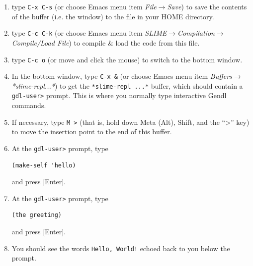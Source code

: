 \documentclass [11pt]{book}
\begin{document}
\begin{enumerate}
\begin{figure}
\begin{lrbox}{\boxedverb}
\begin{minipage}{\linewidth}
\begin{verbatim}
 (in-package :gdl-user)

 (define-object hello ()

   :computed-slots 
   ((greeting "Hello, World!")))

\end{verbatim}
\end{minipage}
\end{lrbox}
\fbox{\usebox{\boxedverb}}

\caption{Example of Simple Object Definition}

\label{fig:simpleobjectdefinition}

\end{figure}

\item type \texttt{C-x C-s} (or choose Emacs menu item \emph{File$\rightarrow$Save}) to save the contents of the buffer (i.e. the window) 
to the file in your HOME directory.

\item type \texttt{C-c C-k} (or choose Emacs menu item \emph{SLIME$\rightarrow$Compilation$\rightarrow$Compile/Load File}) to compile \& load the code from this file.

\item type \texttt{C-c o} (or move and click the mouse)  to switch to the bottom window.

\item In the bottom window, type \texttt{C-x \&} (or choose Emacs menu item \emph{Buffers$\rightarrow$*slime-repl...*}) to get the \texttt{*slime-repl ...*} buffer, which should contain a \texttt{gdl-user>} prompt. This is where you normally type interactive Gendl commands.

\item If necessary, type \texttt{M \textgreater} (that is, hold down Meta (Alt), Shift, and the ``\textgreater'' key) to
move the insertion point to the end of this buffer.

\item At the \texttt{gdl-user>} prompt, type 

\begin{verbatim}(make-self 'hello)
\end{verbatim} and press [Enter].

\item At the \texttt{gdl-user>} prompt, type 

\begin{verbatim}(the greeting)
\end{verbatim} and press [Enter].

\item You should see the words \texttt{Hello, World!} echoed back to you below the prompt.

\end{enumerate}
\end{document}
